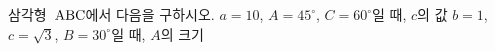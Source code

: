 삼각형~$\mathrm{ABC}$에서 다음을 구하시오.
 $a=10$, $A=45^\circ$, $C=60^\circ$일 때, $c$의 값
 $b=1$, $c=\sqrt{3}$, $B=30^\circ$일 때, $A$의 크기
